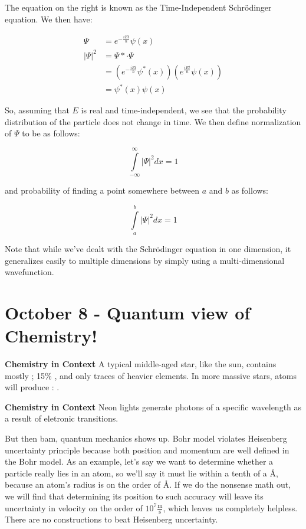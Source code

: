 \documentclass{report}
\begin{document}
The equation on the right is known as the Time-Independent Schr\"odinger equation. We then have:

\begin{align*}
\Psi &= e^{-\frac{iEt}{\hbar}}\psi(x)\\
|\Psi|^2 &= \Psi* \cdot \Psi\\
&= (e^{-\frac{iEt}{\hbar}}\psi^*(x))(e^{\frac{iEt}{\hbar}}\psi(x))\\
&= \psi^*(x) \psi(x)
\end{align*}

So, assuming that $E$ is real and time-independent, we see that the probability distribution of the particle does not change in time. We then define normalization of $\Psi$ to be as follows:

$$\displaystyle\int\limits_{-\infty}^{\infty} |\Psi|^2 dx = 1$$

and probability of finding a point somewhere between $a$ and $b$ as follows:

$$\displaystyle\int\limits_a^b |\Psi|^2 dx = 1$$

Note that while we've dealt with the Schr\"odinger equation in one dimension, it generalizes easily to multiple dimensions by simply using a multi-dimensional wavefunction. 

\chapter{October 8 - Quantum view of Chemistry!}

\begin{center}
\textbf{Chemistry in Context}
A typical middle-aged star, like the sun, contains mostly ; 15\% , and only traces of heavier elements. In more massive stars,  atoms will produce : .

\textbf{Chemistry in Context}
Neon lights generate photons of a specific wavelength as a result of eletronic transitions.
\end{center}

But then bam, quantum mechanics shows up. Bohr model violates Heisenberg uncertainty principle because both position and momentum are well defined in the Bohr model. As an example, let's say we want to determine whether a particle really lies in an atom, so we'll say it must lie within a tenth of a \AA, because an atom's radius is on the order of \AA. If we do the nonsense math out, we will find that determining its position to such accuracy will leave its uncertainty in velocity on the order of $10^7 \mathrm{\frac{m}{s}}$, which leaves us completely helpless. There are no constructions to beat Heisenberg uncertainty.
\end{document}
